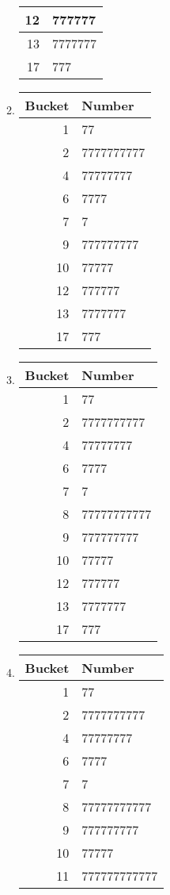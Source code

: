 \documentclass[12pt]{article}
\begin{document}
\begin{enumerate}[a]
\begin{multicols}{2}
\begin{enumerate}[1]
\begin{tabular}{r|l}
			12 & 777777\\\hline
			13 & 7777777\\\hline
			17 & 777
		\end{tabular}
		\item
		\begin{tabular}{r|l}
			Bucket & Number\\\hline\hline
			1 & 77\\\hline
			2 & 7777777777\\\hline
			4 & 77777777\\\hline
			6 & 7777\\\hline
			7 & 7\\\hline
			9 & 777777777\\\hline
			10 & 77777\\\hline
			12 & 777777\\\hline
			13 & 7777777\\\hline
			17 & 777
		\end{tabular}
		\item
		\begin{tabular}{r|l}
			Bucket & Number\\\hline\hline
			1 & 77\\\hline
			2 & 7777777777\\\hline
			4 & 77777777\\\hline
			6 & 7777\\\hline
			7 & 7\\\hline
			8 & 77777777777\\\hline
			9 & 777777777\\\hline
			10 & 77777\\\hline
			12 & 777777\\\hline
			13 & 7777777\\\hline
			17 & 777
		\end{tabular}
		\item
		\begin{tabular}{r|l}
			Bucket & Number\\\hline\hline
			1 & 77\\\hline
			2 & 7777777777\\\hline
			4 & 77777777\\\hline
			6 & 7777\\\hline
			7 & 7\\\hline
			8 & 77777777777\\\hline
			9 & 777777777\\\hline
			10 & 77777\\\hline
			11 & 777777777777\\\hline

\end{tabular}
\end{enumerate}
\end{multicols}
\end{enumerate}
\end{document}
